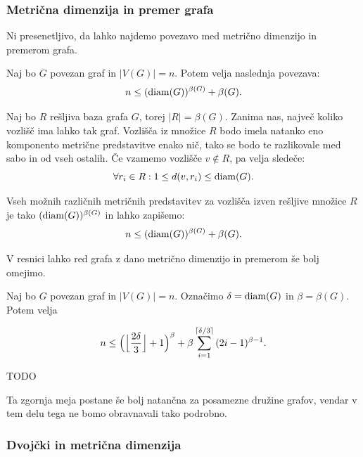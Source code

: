 \documentclass[mat1, tisk]{fmfdelo}
\newcommand{\1}{(1, 1, \ldots, 1)}
\newcommand{\2}{(2, 2, \ldots, 2)}
\begin{document}
\subsubsection{Metrična dimenzija in premer grafa} \label{ss:mdim_premer}

Ni presenetljivo, da lahko najdemo povezavo med metrično dimenzijo in premerom grafa.

\begin{trditev}\label{trd:groba_meja_mdim_premer}
    Naj bo $G$ povezan graf in $|V(G)| = n$. Potem velja naslednja povezava:
    $$n \leq ({\rm diam}(G))^{\beta (G)} + \beta (G). $$
\end{trditev}

\begin{dokaz}
    Naj bo $R$ rešljiva baza grafa $G$, torej $|R| = \beta(G).$ Zanima nas, največ koliko 
    vozlišč ima lahko tak graf. Vozlišča iz množice $R$ bodo imela natanko eno 
    komponento metrične predstavitve enako nič, tako se bodo te razlikovale med sabo in od
    vseh ostalih. Če vzamemo vozlišče $v \notin R$, pa velja sledeče:
    $$\forall r_i \in R: 1 \leq d(v, r_i) \leq {\rm diam}(G).$$
    
    Vseh možnih različnih metričnih predstavitev za vozlišča izven rešljive množice $R$ 
    je tako $({\rm diam}(G))^{\beta (G)}$
    in lahko zapišemo:
    $$n \leq ({\rm diam}(G))^{\beta (G)} + \beta (G).$$
\end{dokaz}

V resnici lahko red grafa z dano metrično dimenzijo in premerom še bolj omejimo.

\begin{trditev} \label{trd:meja_mdim_premer}
    Naj bo $G$ povezan graf in $|V(G)| = n$. Označimo $ \delta = {\rm diam}(G)$ in 
    $\beta = \beta (G)$. Potem velja

    $$n \leq \Bigl ( \Bigl \lfloor {\frac{2 \delta}{3}}\Bigr \rfloor + 1 \Bigr )^{\beta} + 
    \beta \sum_{i = 1}^{\lceil \delta /3 \rceil} {(2i - 1)^{\beta - 1}}. $$
\end{trditev}

\begin{dokaz}
    TODO
\end{dokaz}

Ta zgornja meja postane še bolj natančna za posamezne družine grafov, vendar v tem delu
tega ne bomo obravnavali tako podrobno.




\subsubsection{Dvojčki in metrična dimenzija} \label{ss:dvojcki_mdim}
\end{document}
